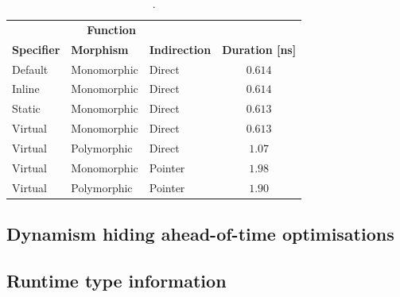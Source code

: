\begin{table}[H]
  \caption{.}
  \label{tab:dynamic-dispatch-perf}
  \centering
  \begin{tabular}{lllc}
    \toprule
    \multicolumn{3}{c}{\textbf{Function}} \\
    \cmidrule(r){1-3}
    \textbf{Specifier} & \textbf{Morphism} & \textbf{Indirection} & \textbf{Duration [ns]} \\
    \midrule
    Default & Monomorphic & Direct & $0.614$ \\
    Inline & Monomorphic & Direct & $0.614$ \\
    Static & Monomorphic & Direct & $0.613$ \\
    Virtual & Monomorphic & Direct & $0.613$ \\
    Virtual & Polymorphic & Direct & $1.07$ \\
    Virtual & Monomorphic & Pointer & $1.98$ \\
    Virtual & Polymorphic & Pointer & $1.90$ \\
    \bottomrule
  \end{tabular}
\end{table}



\subsection{Dynamism hiding ahead-of-time optimisations}



\subsection{Runtime type information}



